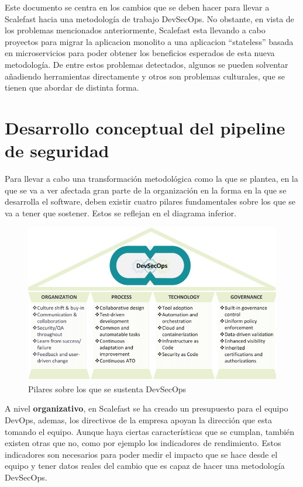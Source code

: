 \documentclass[12pt]{report} %
\begin{document}
Este documento se centra en los cambios que se deben hacer para llevar a
Scalefast hacia una metodología de trabajo \gls{DevSecOps}.
No obstante, en vista de los problemas mencionados anteriormente, Scalefast esta
llevando a cabo proyectos para migrar la aplicacion monolito a una aplicacion
``stateless'' basada en microservicios para poder obtener los beneficios
esperados de esta nueva metodología.
De entre estos problemas detectados, algunos se pueden solventar añadiendo
herramientas directamente y otros son problemas culturales, que se tienen que
abordar de distinta forma.


\section{Desarrollo conceptual del pipeline de seguridad}

Para llevar a cabo una transformación metodológica como la que se plantea, 
en la que se va a ver afectada gran parte de la organización en la forma en la
que se desarrolla el software, deben existir cuatro pilares fundamentales sobre 
los que se va a tener que sostener.
Estos se reflejan en el diagrama inferior.

\begin{figure}[H] 
  \includegraphics[width=\textwidth]{DevSecOps-pillars}
  \caption{Pilares sobre los que se sustenta DevSecOps}
  \label{fig:DevSecOps-pillars}
\end{figure}

A nivel \textbf{organizativo}, en Scalefast se ha creado un presupuesto para el equipo
DevOps, ademas, los directivos de la empresa apoyan la dirección que esta
tomando el equipo.
Aunque haya ciertas características que se cumplan, también existen otras que
no, como por ejemplo los indicadores de rendimiento.
Estos indicadores son necesarios para poder medir el impacto que se hace desde
el equipo y tener datos reales del cambio que es capaz de hacer una metodología
\gls{DevSecOps}.
\end{document}
